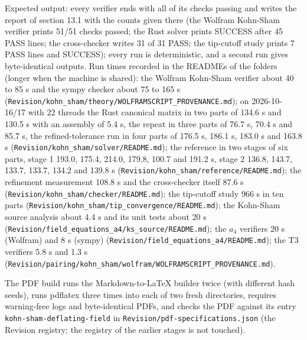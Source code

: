 \documentclass[11pt]{article}
\begin{document}
Expected output: every verifier ends with all of its checks passing and writes the report of section 13.1 with the counts given there (the Wolfram Kohn-Sham verifier prints 51/51 checks passed; the Rust solver prints SUCCESS after 45 PASS lines; the cross-checker writes 31 of 31 PASS; the tip-cutoff study prints 7 PASS lines and SUCCESS); every run is deterministic, and a second run gives byte-identical outputs. Run times recorded in the READMEs of the folders (longer when the machine is shared): the Wolfram Kohn-Sham verifier about 40 to 85 s and the sympy checker about 75 to 165 s (\texttt{Revision\allowbreak{}/kohn\_sh\allowbreak{}am/theor\allowbreak{}y/WOLFRA\allowbreak{}MSCRIPT\_\allowbreak{}PROVENAN\allowbreak{}CE.md}); on 2026-10-16/17 with 22 threads the Rust canonical matrix in two parts of 134.6 s and 130.5 s with an assembly of 5.4 s, the repeat in three parts of 76.7 s, 70.4 s and 85.7 s, the refined-tolerance run in four parts of 176.5 s, 186.1 s, 183.0 s and 163.8 s (\texttt{Revision\allowbreak{}/kohn\_sh\allowbreak{}am/solve\allowbreak{}r/README\allowbreak{}.md}); the reference in two stages of six parts, stage 1 193.0, 175.4, 214.0, 179.8, 100.7 and 191.2 s, stage 2 136.8, 143.7, 133.7, 133.7, 134.2 and 139.8 s (\texttt{Revision\allowbreak{}/kohn\_sh\allowbreak{}am/refer\allowbreak{}ence/REA\allowbreak{}DME.md}); the refinement measurement 108.8 s and the cross-checker itself 87.6 s (\texttt{Revision\allowbreak{}/kohn\_sh\allowbreak{}am/check\allowbreak{}er/READM\allowbreak{}E.md}); the tip-cutoff study 966 s in ten parts (\texttt{Revision\allowbreak{}/kohn\_sh\allowbreak{}am/tip\_c\allowbreak{}onvergen\allowbreak{}ce/READM\allowbreak{}E.md}); the Kohn-Sham source analysis about 4.4 s and its unit tests about 20 s (\texttt{Revision\allowbreak{}/field\_e\allowbreak{}quations\allowbreak{}\_a4/ks\_s\allowbreak{}ource/RE\allowbreak{}ADME.md}); the $a_4$ verifiers 20 s (Wolfram) and 8 s (sympy) (\texttt{Revision\allowbreak{}/field\_e\allowbreak{}quations\allowbreak{}\_a4/READ\allowbreak{}ME.md}); the T3 verifiers 5.8 s and 1.3 s (\texttt{Revision\allowbreak{}/pairing\allowbreak{}/kohn\_sh\allowbreak{}am/wolfr\allowbreak{}am/WOLFR\allowbreak{}AMSCRIPT\allowbreak{}\_PROVENA\allowbreak{}NCE.md}).

The PDF build runs the Markdown-to-LaTeX builder twice (with different hash seeds), runs pdflatex three times into each of two fresh directories, requires warning-free logs and byte-identical PDFs, and checks the PDF against its entry \texttt{kohn-sha\allowbreak{}m-deflat\allowbreak{}ing-fiel\allowbreak{}d} in \texttt{Revision\allowbreak{}/pdf-spe\allowbreak{}cificati\allowbreak{}ons.json} (the Revision registry; the registry of the earlier stages is not touched).
\end{document}
